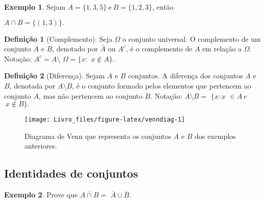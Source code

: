 \documentclass[]{book}
\theoremstyle{definition}
\newtheorem{definition}{Definição}[chapter]
\theoremstyle{definition}
\newtheorem{example}{Exemplo}[chapter]
\theoremstyle{definition}
\theoremstyle{remark}
\begin{document}
\begin{example}
\protect\hypertarget{exm:exIntersecao}{}{\label{exm:exIntersecao} }Sejam \(A = \{1,3,5\} \ \text{e} \ B = \{1,2,3\}\), então

\(A \cap B = \{(1,3)\}.\)
\end{example}

\begin{definition}[Complemento]
\protect\hypertarget{def:defcompl}{}{\label{def:defcompl} \iffalse (Complemento) \fi{} }Seja \(\Omega\) o conjunto universal.
O complemento de um conjunto \(A\) e \(B\), denotado por \(\bar{A}\) ou \(A^c\), é o complemento de \(A\) em relação a \(\Omega.\)
Notação:
\(A^c = A \setminus\) \(\Omega = \{x :\) \(x \notin A\}.\)
\end{definition}

\begin{definition}[Diferença]
\protect\hypertarget{def:defdifer}{}{\label{def:defdifer} \iffalse (Diferença) \fi{} }Sejam \(A\) e \(B\) conjuntos.
A diferença dos conjuntos \(A\) e \(B\), denotada por \(A \setminus B\), é o conjunto formado pelos elementos que pertencem ao conjunto \(A\), mas não pertencem ao conjunto \(B\).
Notação:
\(A \setminus B =\) \(\{x : x\) \(\in A \ e\) \(\ x \notin B\}.\)
\end{definition}

\begin{figure}

{\centering \texttt{[image: Livro\_files/figure-latex/venndiag-1]} 

}

\caption{Diagrama de Venn que representa os conjuntos $A$ e $B$ dos exemplos anteriores.}\label{fig:venndiag}
\end{figure}

\hypertarget{identidades-de-conjuntos}{%
\subsection{Identidades de conjuntos}\label{identidades-de-conjuntos}}

\begin{example}
\protect\hypertarget{exm:unnamed-chunk-13}{}{\label{exm:unnamed-chunk-13} }Prove que \(\overline{A\cap B} =\) \(\overline A \cup \overline B.\)
\end{example}
\end{document}
